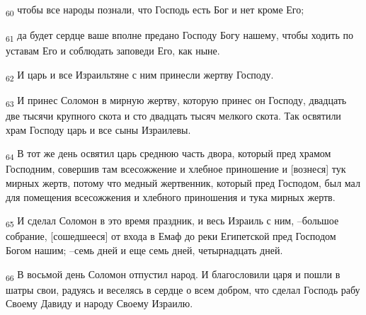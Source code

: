 \begin{tcolorbox}
\textsubscript{60} чтобы все народы познали, что Господь есть Бог и нет кроме Его;
\end{tcolorbox}
\begin{tcolorbox}
\textsubscript{61} да будет сердце ваше вполне предано Господу Богу нашему, чтобы ходить по уставам Его и соблюдать заповеди Его, как ныне.
\end{tcolorbox}
\begin{tcolorbox}
\textsubscript{62} И царь и все Израильтяне с ним принесли жертву Господу.
\end{tcolorbox}
\begin{tcolorbox}
\textsubscript{63} И принес Соломон в мирную жертву, которую принес он Господу, двадцать две тысячи крупного скота и сто двадцать тысяч мелкого скота. Так освятили храм Господу царь и все сыны Израилевы.
\end{tcolorbox}
\begin{tcolorbox}
\textsubscript{64} В тот же день освятил царь среднюю часть двора, который пред храмом Господним, совершив там всесожжение и хлебное приношение и [вознеся] тук мирных жертв, потому что медный жертвенник, который пред Господом, был мал для помещения всесожжения и хлебного приношения и тука мирных жертв.
\end{tcolorbox}
\begin{tcolorbox}
\textsubscript{65} И сделал Соломон в это время праздник, и весь Израиль с ним, --большое собрание, [сошедшееся] от входа в Емаф до реки Египетской пред Господом Богом нашим; --семь дней и еще семь дней, четырнадцать дней.
\end{tcolorbox}
\begin{tcolorbox}
\textsubscript{66} В восьмой день Соломон отпустил народ. И благословили царя и пошли в шатры свои, радуясь и веселясь в сердце о всем добром, что сделал Господь рабу Своему Давиду и народу Своему Израилю.
\end{tcolorbox}
